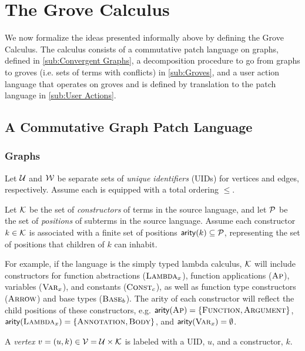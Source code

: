 
\section{The Grove Calculus}%
\label{sec:Formalism}

We now formalize the ideas presented informally above by defining the Grove Calculus. The calculus consists of a commutative patch language on graphs, defined in \autoref{sub:Convergent Graphs}, a decomposition procedure to go from graphs to groves (i.e. sets of terms with conflicts) in \autoref{sub:Groves}, and a user action language that operates on groves and is defined by translation to the patch language in \autoref{sub:User Actions}.

\subsection{A Commutative Graph Patch Language}%
\label{sub:Convergent Graphs}

\subsubsection{Graphs}
Let $\U$ and $\W$ be separate sets of \emph{unique identifiers} (UIDs) for vertices and edges, respectively. Assume each is equipped with a total ordering $\leq$. 

Let $\K$ be the set of \emph{constructors} of terms in the source language, and let $\P$ be the set of \emph{positions} of subterms in the source language. Assume each constructor $k\in\K$ is associated with a finite set of positions $\mathsf{arity}(k)\subseteq \P$, representing the set of positions that children of $k$ can inhabit.

For example, if the language is the simply typed lambda calculus, $\K$ will include constructors for function abstractions ($\textsc{Lambda}_x$), function applications ($\textsc{Ap}$), variables ($\textsc{Var}_x$), and constants ($\textsc{Const}_c$), as well as function type constructors ($\textsc{Arrow}$) and base types ($\textsc{Base}_b$). The arity of each constructor will reflect the child positions of these constructors, e.g. $\mathsf{arity}(\textsc{Ap}) = \{\textsc{Function} , \textsc{Argument}\}$, $\mathsf{arity}(\textsc{Lambda}_x) = \{\textsc{Annotation} , \textsc{Body}\}$, and $\mathsf{arity}(\textsc{Var}_x) = \emptyset$.

A \emph{vertex} $v = (u, k) \in \V = \U \times \K$ is labeled with a UID, $u$, and a constructor, $k$. 

